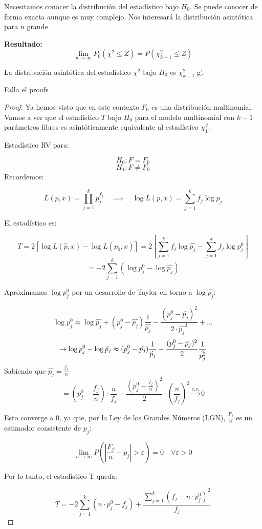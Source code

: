  Necesitamos conocer la distribución del estadístico bajo $H_0$.
 Se puede conocer de forma exacta aunque es muy complejo. Nos interesará la distribución asintótica para n grande.

 \textbf{Resultado:}
 \[
 \lim_{n \to \infty} P_0(\chi^2 \leq Z)=P(\chi^2_{k-1} \leq Z)
 \]

La distribución asintótica del estadístico $\chi^2$ bajo $H_0$ es $\chi^2_{k-1}$ g'.



Falla el proofs
\begin{proof}
Ya hemos visto que en este contexto \( F_0 \) es una distribución multinomial. 
Vamos a ver que el estadístico \( T \) bajo \( H_0 \) para el modelo multinomial con \( k-1 \) parámetros libres es asintóticamente equivalente al estadístico \( \chi^2_1 \).

Estadístico RV para:

\[
H_0: F = F_0
\]
\[
H_1: F \neq F_0
\]
\newpage
Recordemos:

\[
L(p, x) = \prod_{j=1}^{k} p_j^{f_j} \quad \implies \quad \log L(p, x) = \sum_{j=1}^{k} f_j \log p_j
\]

El estadístico es:

\[
T = 2 \left[\log L(\hat{p}, x) - \log L(p_0, x)\right] = 2 \left[ \sum_{j=1}^{k} f_j \log \hat{p_j} - \sum_{j=1}^{k} f_j \log p_j^0 \right] 
\]\[= -2 \sum_{j=1}^{k} \left( \log p_j^0 - \log \hat{p_j} \right)
\]

Aproximamos \( \log p_j^0 \) por un desarrollo de Taylor en torno a \( \log \hat{p_j} \):

\[
\log p_j^0 \approx \log \hat{p_j} + (p_j^0 - \hat{p_j}) \frac{1}{\hat{p_j}} - \frac{(p_j^0 - \hat{p_j})^2}{2 \cdot \hat{p_j}^2}+ \dots
\]
\[
\to \log p_j^0- \log \hat{p_j}\thickapprox (p^0_j-\hat{p_j}) \frac{1}{\hat{p_j}}- \frac{(p^0_j-\hat{p_j})^2}{2}\frac{1}{\hat{p_j^2}}
\]
Sabiendo que $\hat{p_j}=\frac{f_j}{n}$
\[
=\left(p_j^0-\frac{f_j}{n}\right) \cdot \frac{n}{f_j} - \frac{\left(p_j^0-\frac{f_j}{n}\right)^2}{2}\cdot \left(\frac{n}{f_j}\right)^2 \xrightarrow{c.s.} 0
\]

Esto converge a 0, ya que, por la Ley de los Grandes Números (LGN), \( \frac{F_j}{n} \) es un estimador consistente de \( p_j \):

\[
\lim_{n \to \infty} P \left( \left| \frac{F_j}{n} - p_j \right| > \varepsilon \right) = 0 \quad \forall \varepsilon>0
\]

Por lo tanto, el estadístico T queda:

\[
T = -2 \sum_{j=1}^{k} \left( n \cdot p_j^0 - f_j \right) + \frac{\sum_{j=1}^{k} (f_j - n \cdot p_j^0)^2}{f_j}
\]

\end{proof}


